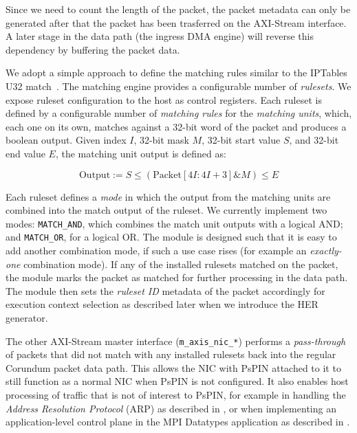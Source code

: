 Since we need to count the length of the packet, the packet metadata can only be generated after that the packet has been trasferred on the AXI-Stream interface.  A later stage in the data path (the ingress DMA engine) will reverse this dependency by buffering the packet data.

We adopt a simple approach to define the matching rules similar to the IPTables U32 match~\cite{cohen_iptables_nodate}.  The matching engine provides a configurable number of \emph{rulesets}.  We expose ruleset configuration to the host as control registers.  Each ruleset is defined by a configurable number of \emph{matching rules} for the \emph{matching units}, which, each one on its own, matches against a 32-bit word of the packet and produces a boolean output.  Given index $I$, 32-bit mask $M$, 32-bit start value $S$, and 32-bit end value $E$, the matching unit output is defined as:

\[
\text{Output} := S \le (\text{Packet}[4I:4I+3] \mathbin{\&} M) \le E
\]

Each ruleset defines a \emph{mode} in which the output from the matching units are combined into the match output of the ruleset.  We currently implement two modes: \texttt{MATCH\_\-AND}, which combines the match unit outputs with a logical AND; and \texttt{MATCH\_\-OR}, for a logical OR.  The module is designed such that it is easy to add another combination mode, if such a use case rises (for example an \emph{exactly-one} combination mode).  If any of the installed rulesets matched on the packet, the module marks the packet as matched for further processing in the data path.  The module then sets the \emph{ruleset ID} metadata of the packet accordingly for execution context selection as described later when we introduce the HER generator.

The other AXI-Stream master interface (\texttt{m\_\-axis\_\-nic\_\-*}) performs a \emph{pass-through} of packets that did not match with any installed rulesets back into the regular Corundum packet data path.  This allows the NIC with PsPIN attached to it to still function as a normal NIC when PsPIN is not configured.  It also enables host processing of traffic that is not of interest to PsPIN, for example in handling the \emph{Address Resolution Protocol} (ARP) as described in , or when implementing an application-level control plane in the MPI Datatypes application as described in .


